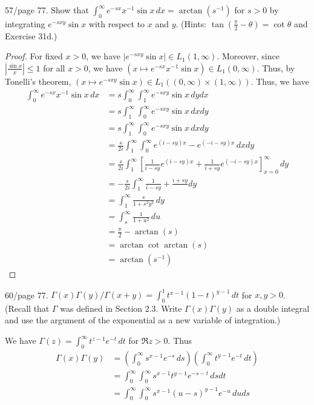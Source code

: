 \documentclass{article}
\begin{document}
 57/page 77. Show that $\int_0^\infty e^{-sx}x^{-1} \sin x \, dx = \arctan(s^{-1})$ for $s > 0$ by integrating $e^{-sxy}\sin x$ with respect to $x$ and $y$.  (Hints: $\tan(\frac \pi 2 - \theta) = \cot \theta$ and Exercise 31d.) %
\begin{proof}
For fixed $x > 0$, we have $\left| e^{-sxy} \sin x \right| \in L_1(1, \infty)$. Moreover, since $\left| \frac {\sin x} x \right| \le 1$ for all $x > 0$, we have $(x \mapsto e^{-sx} x^{-1} \sin x) \in L_1(0,\infty)$. Thus, by Tonelli's theorem, $(x \mapsto e^{-sxy} \sin x) \in L_1((0,\infty) \times (1, \infty))$. Thus, we have
\begin{align*}
\int_0^\infty  e^{-sx} x^{-1} \sin x \, dx & =  s \int_0^\infty \int_1^\infty e^{-sxy} \sin x \, dy dx 
\\ & =  s \int_1^\infty \int_0^\infty e^{-sxy} \sin x \, dx dy
\\ & =  s \int_1^\infty \int_0^\infty e^{-sxy} \sin x \, dx dy
\\ & =  \frac s {2i} \int_1^\infty \int_0^\infty e^{(i-sy)x} - e^{(-i-sy)x} \, dx dy
\\ & =  \frac s {2i} \int_1^\infty \left[\frac 1 {i - sy} e^{(i-sy)x} + \frac 1 {i + sy} e^{(-i-sy)x} \right]_{x = 0}^\infty \,  dy
\\ & =  - \frac s {2i} \int_1^\infty \frac 1 {i - sy} + \frac {i + sy}  \,  dy
\\ & =   \int_1^\infty \frac s {1 + s^2y^2}  \,  dy
\\ & =   \int_{s}^\infty \frac 1 {1 + u^2}  \,  du
\\ & = \frac \pi 2 - \arctan(s) 
\\ & = \arctan \cot \arctan(s) 
\\ & = \arctan (s^{-1}) 
\end{align*}
\end{proof}

 60/page 77. $\Gamma(x) \Gamma(y)/ \Gamma(x + y) = \int_0^1 t^{x-1}(1-t)^{y-1} \, dt$ for $x,y > 0$. (Recall that $\Gamma$ was defined in Section 2.3. Write $\Gamma(x) \Gamma(y)$ as a double integral and use the argument of the exponential as a new variable of integration.)

We have $\Gamma(z) = \int_0^\infty t^{z - 1} e^{-t} \, dt$ for $\Re z > 0$.  Thus
\begin{align*}
\Gamma(x) \Gamma(y)  & = \left(\int_0^\infty s^{x - 1} e^{-s} \, ds \right) \left( \int_0^\infty t^{y - 1} e^{-t} \, dt \right)
\\ & = \int_0^ \infty \int_0^\infty s^{x - 1} t^{y-1} e^{-s - t} \, ds dt
\\ & = \int_0^\infty \int_0^\infty s^{x - 1} (u - s)^{y-1} e^{-u} \, du ds
\end{align*}
\end{document}
